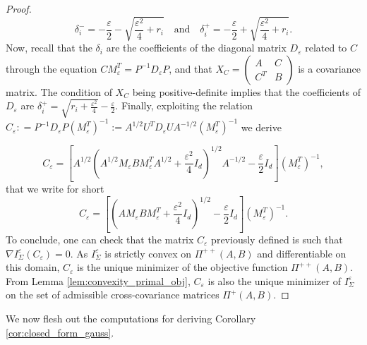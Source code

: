 \documentclass[]{article}
\numberwithin{equation}{section}
\theoremstyle{plain}
\begin{document}
\begin{proof}
\begin{equation*}
    \delta_i^{-} = -\frac{\varepsilon}{2} - \sqrt{\frac{\varepsilon^2}{4} + r_i} \quad \text{and} \quad \delta_i^+ = -\frac{\varepsilon}{2} + \sqrt{\frac{\varepsilon^2}{4} + r_i}.
\end{equation*}
Now, recall that the $\delta_i$ are the coefficients of the diagonal matrix $D_\varepsilon$ related to $C$ through the equation $CM_{\varepsilon}^T= P^{-1}D_\varepsilon P$, and that $X_C = \begin{pmatrix}
    A & C \\
    C^T & B
\end{pmatrix}$ is a covariance matrix. The condition of $X_C$ being positive-definite implies that the coefficients of $D_\varepsilon$ are $\delta_i^{+} =  \sqrt{r_i+ \frac{\varepsilon^2}{4}} -\frac{\varepsilon}{2}$. Finally, exploiting the relation $C_\varepsilon : = P^{-1} D_{\varepsilon}P (M_{\varepsilon}^T)^{-1} := A^{1/2}U^T D_\varepsilon U A^{-1/2} (M_{\varepsilon}^T)^{-1}$ we derive 

\begin{equation*}
    C_\varepsilon  = \left[A^{1/2}\left( A^{1/2}M_{\varepsilon}BM_{\varepsilon}^T A^{1/2} +\frac{\varepsilon^2}{4}I_d\right)^{1/2}A^{-1/2} - \frac{\varepsilon}{2}I_d \right](M_{\varepsilon}^T)^{-1},
\end{equation*}
that we write for short
\begin{equation*}
	C_\varepsilon  = \left[\left(A M_{\varepsilon}BM_{\varepsilon}^T  +\frac{\varepsilon^2}{4}I_d\right)^{1/2} - \frac{\varepsilon}{2}I_d \right](M_{\varepsilon}^T)^{-1}.
\end{equation*}
To conclude, one can check that the matrix $C_\varepsilon$ previously defined is such that $\nabla I_{\Sigma}^{\varepsilon}(C_\varepsilon) = 0$. As $I_{\Sigma}^{\varepsilon}$ is strictly convex on $\Pi^{++}(A, B)$ and differentiable on this domain, $C_\varepsilon$ is the unique minimizer of the objective function $\Pi^{++}(A,B)$. From Lemma \ref{lem:convexity_primal_obj}, $C_\varepsilon$ is also the unique minimizer of $I_\Sigma^{\varepsilon}$ on the set of admissible cross-covariance matrices $\Pi^{+}(A,B)$.

\end{proof}

We now flesh out the computations for deriving Corollary \ref{cor:closed_form_gauss}.
\end{document}
